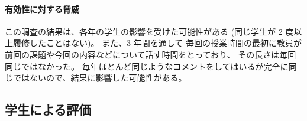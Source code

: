 \paragraph{有効性に対する脅威}
この調査の結果は、各年の学生の影響を受けた可能性がある (同じ学生が 2 度以上履修したことはない)。
また、3 年間を通して
毎回の授業時間の最初に教員が前回の課題や今回の内容などについて話す時間をとっており、
その長さは毎回同じではなかった。
毎年ほとんど同じようなコメントをしてはいるが完全に同じではないので、結果に影響した可能性がある。

\subsection{学生による評価}
\label{subsection:result__students}


